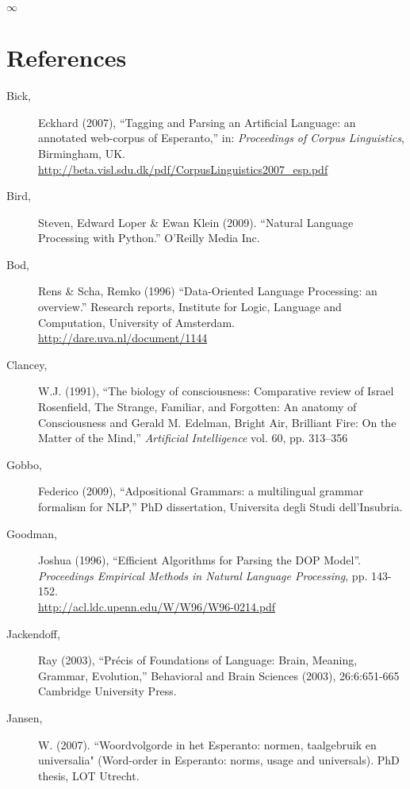 \documentclass[10pt,a4paper]{article}
\begin{document}
\begin{center}
$\infty$
\end{center}

\section{References}

\begin{description}
\item[Bick,] Eckhard (2007), ``Tagging and Parsing an Artificial Language: an
annotated web-corpus of Esperanto,'' in: {\em Proceedings of Corpus
Linguistics}, Birmingham, UK. \\
\url{http://beta.visl.sdu.dk/pdf/CorpusLinguistics2007_esp.pdf}

\item[Bird,] Steven, Edward Loper \& Ewan Klein (2009).
    ``Natural Language Processing with Python.''  O'Reilly Media Inc.

\item[Bod,] Rens \& Scha, Remko (1996) ``Data-Oriented Language Processing: an
overview.'' Research reports, Institute for Logic, Language and Computation,
University of Amsterdam. \\
\url{http://dare.uva.nl/document/1144}

\item[Clancey,] W.J. (1991), ``The biology of consciousness: Comparative review
of Israel Rosenfield, The Strange, Familiar, and Forgotten: An anatomy of
Consciousness and Gerald M. Edelman, Bright Air, Brilliant Fire: On the Matter
of the Mind,'' {\em Artificial Intelligence} vol. 60, pp. 313--356

\item[Gobbo,] Federico (2009), ``Adpositional Grammars: a multilingual grammar
formalism for NLP,'' PhD dissertation, Universita degli Studi dell'Insubria.

\item[Goodman,] Joshua (1996), ``Efficient Algorithms for Parsing the DOP
Model''. {\em Proceedings Empirical Methods in Natural Language Processing},
pp. 143-152. \\ \url{http://acl.ldc.upenn.edu/W/W96/W96-0214.pdf}

\item[Jackendoff,] Ray (2003), ``Précis of Foundations of Language: Brain, Meaning,
Grammar, Evolution,'' Behavioral and Brain Sciences (2003), 26:6:651-665
Cambridge University Press.

\item[Jansen,] W. (2007). ``Woordvolgorde in het Esperanto: normen, taalgebruik en
universalia" (Word-order in Esperanto: norms, usage and universals). PhD
thesis, LOT Utrecht.


\end{description}
\end{document}
